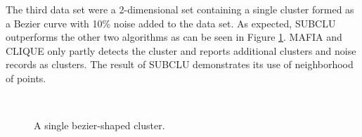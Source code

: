 The third data set were a 2-dimensional set containing a single cluster formed as a Bezier curve with 10\% noise added to the data set. As expected, SUBCLU outperforms the other two algorithms as can be seen in Figure \ref{fig:accuracy_bezier}. MAFIA and CLIQUE only partly detects the cluster and reports additional clusters and noise records as clusters. The result of SUBCLU demonstrates its use of neighborhood of points.
\begin{figure}[H]
    \vspace*{-0.7cm}
    \centering
    ~~~~
    ~~~~
    \caption{A single bezier-shaped cluster.}
    \label{fig:accuracy_bezier}
\end{figure}

